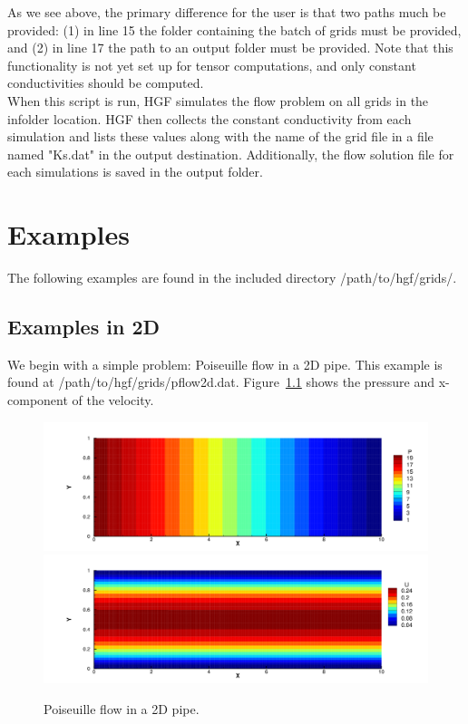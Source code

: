 \documentclass{report}
\begin{document}
\noindent As we see above, the primary difference for the user is that
two paths much be provided: (1) in line 15 the folder containing
the batch of grids must be provided, and (2) in line 17 the
path to an output folder must be provided. Note that this functionality
is not yet set up for tensor computations, and only constant conductivities
should be computed.\\

\noindent When this script is run, HGF simulates the flow problem
on all grids in the infolder location. HGF then collects the
constant conductivity from each simulation and lists these values along
with the name of the grid file in a file named "Ks.dat" in the output
destination. Additionally, the flow solution file for each simulations is
saved in the output folder.

\chapter{Examples}

\noindent The following examples are found in the included directory /path/to/hgf/grids/.\\

\section{Examples in 2D}

\noindent We begin with a simple problem: Poiseuille flow in a 2D pipe. This
example is found at /path/to/hgf/grids/pflow2d.dat. Figure~\ref{fig:2dpflow}
shows the pressure and x-component of the velocity.\\
\begin{figure}
  \centering
  \includegraphics[width=.9\textwidth]{images/pflow2dP.png}\\
  \includegraphics[width=.9\textwidth]{images/pflow2dU.png}
  \caption{\label{fig:2dpflow}Poiseuille flow in a 2D pipe.}
\end{figure}
\end{document}
